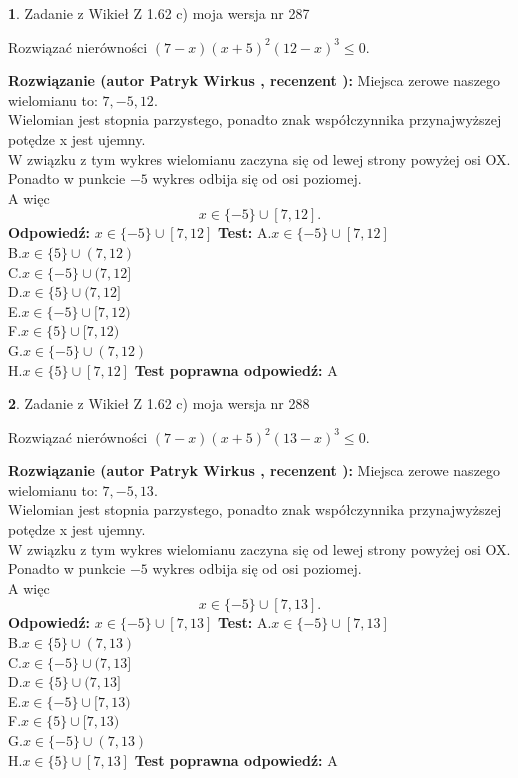 \documentclass[12pt, a4paper]{article}
\theoremstyle{definition} %
\newtheorem{zad}{}
\newcommand{\zadStart}[1]{\begin{zad}#1\newline}
\newcommand{\zadStop}{\end{zad}}
\newcommand{\rozwStart}[2]{\noindent \textbf{Rozwiązanie (autor #1 , recenzent #2): }\newline}
\newcommand{\rozwStop}{\newline}
\newcommand{\odpStart}{\noindent \textbf{Odpowiedź:}\newline}
\newcommand{\odpStop}{\newline}
\newcommand{\testStart}{\noindent \textbf{Test:}\newline}
\newcommand{\testStop}{\newline}
\newcommand{\kluczStart}{\noindent \textbf{Test poprawna odpowiedź:}\newline}
\newcommand{\kluczStop}{\newline}
\begin{document}
\zadStart{Zadanie z Wikieł Z 1.62 c) moja wersja nr 287}

Rozwiązać nierówności $(7-x)(x+5)^{2}(12-x)^{3}\le0$.
\zadStop
\rozwStart{Patryk Wirkus}{}
Miejsca zerowe naszego wielomianu to: $7, -5, 12$.\\
Wielomian jest stopnia parzystego, ponadto znak współczynnika przy\linebreak najwyższej potędze x jest ujemny.\\ W związku z tym wykres wielomianu zaczyna się od lewej strony powyżej osi OX.\\
Ponadto w punkcie $-5$ wykres odbija się od osi poziomej.\\
A więc $$x \in \{-5\} \cup [7,12].$$
\rozwStop
\odpStart
$x \in \{-5\} \cup [7,12]$
\odpStop
\testStart
A.$x \in \{-5\} \cup [7,12]$\\
B.$x \in \{5\} \cup (7,12)$\\
C.$x \in \{-5\} \cup (7,12]$\\
D.$x \in \{5\} \cup (7,12]$\\
E.$x \in \{-5\} \cup [7,12)$\\
F.$x \in \{5\} \cup [7,12)$\\
G.$x \in \{-5\} \cup (7,12)$\\
H.$x \in \{5\} \cup [7,12]$
\testStop
\kluczStart
A
\kluczStop



\zadStart{Zadanie z Wikieł Z 1.62 c) moja wersja nr 288}

Rozwiązać nierówności $(7-x)(x+5)^{2}(13-x)^{3}\le0$.
\zadStop
\rozwStart{Patryk Wirkus}{}
Miejsca zerowe naszego wielomianu to: $7, -5, 13$.\\
Wielomian jest stopnia parzystego, ponadto znak współczynnika przy\linebreak najwyższej potędze x jest ujemny.\\ W związku z tym wykres wielomianu zaczyna się od lewej strony powyżej osi OX.\\
Ponadto w punkcie $-5$ wykres odbija się od osi poziomej.\\
A więc $$x \in \{-5\} \cup [7,13].$$
\rozwStop
\odpStart
$x \in \{-5\} \cup [7,13]$
\odpStop
\testStart
A.$x \in \{-5\} \cup [7,13]$\\
B.$x \in \{5\} \cup (7,13)$\\
C.$x \in \{-5\} \cup (7,13]$\\
D.$x \in \{5\} \cup (7,13]$\\
E.$x \in \{-5\} \cup [7,13)$\\
F.$x \in \{5\} \cup [7,13)$\\
G.$x \in \{-5\} \cup (7,13)$\\
H.$x \in \{5\} \cup [7,13]$
\testStop
\kluczStart
A
\kluczStop
\end{document}
